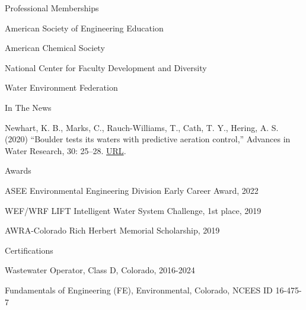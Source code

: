 \documentclass{resume} %
\begin{document}
\begin{rSection}{Professional Memberships}

American Society of Engineering Education

American Chemical Society

National Center for Faculty Development and Diversity

Water Environment Federation

\end{rSection}

\begin{rSection}{In The News}

Newhart, K. B., Marks, C., Rauch-Williams, T., Cath, T. Y., Hering, A. S. (2020) “Boulder tests its waters with predictive aeration control,” Advances in Water Research, 30: 25–28. \href{https://www.advancesinwaterresearch.org/awr/20200709/MobilePagedArticle.action?articleId=1621836&pm=1#articleId1621836}{URL}.
\end{rSection}


\begin{rSection}{Awards}

ASEE Environmental Engineering Division Early Career Award, 2022

WEF/WRF LIFT Intelligent Water System Challenge, 1st place, 2019

AWRA-Colorado Rich Herbert Memorial Scholarship, 2019

\end{rSection}


\begin{rSection}{Certifications}

Wastewater Operator, Class D, Colorado, 2016-2024

Fundamentals of Engineering (FE), Environmental, Colorado, NCEES ID 16-475-7
\end{rSection}
\end{document}
